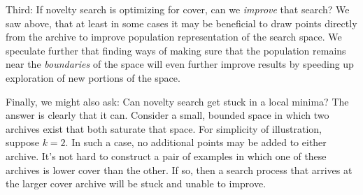 \documentclass[twoside]{article}
\begin{document}
Third: If novelty search is optimizing for cover, can we \emph{improve} that search?  We saw above, that at least in some cases it may be beneficial to draw points directly from the archive to improve population representation of the search space.  We speculate further that finding ways of making sure that the population remains near the \emph{boundaries} of the space will even further improve results by speeding up exploration of new portions of the space.

Finally, we might also ask:  Can novelty search get stuck in a local minima?  The answer is clearly that it can.  Consider a small, bounded space in which two archives exist that both saturate that space.  For simplicity of illustration, suppose $k=2$.  In such a case, no additional points may be added to either archive.  It's not hard to construct a pair of examples in which one of these archives is lower cover than the other.  If so, then a search process that arrives at the larger cover archive will be stuck and unable to improve.  
\end{document}
